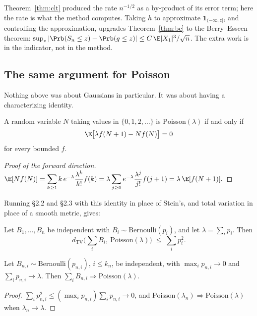 \documentclass[11pt]{article}
\newcommand{\Poi}{\mathrm{Poisson}}
\newcommand{\Ber}{\mathrm{Bernoulli}}
\newcommand{\TV}{d_{\mathrm{TV}}}
\begin{document}
\begin{remark}
Theorem~\ref{thm:clt} produced the rate $n^{-1/2}$ as a by-product of its error term; here the rate is what the method computes. Taking $h$ to approximate $\mathbf 1_{(-\infty,z]}$, and controlling the approximation, upgrades Theorem~\ref{thm:be} to the Berry--Esseen theorem: $\sup_z|\Prb(S_n\le z)-\Prb(g\le z)|\le C\,\E|X_1|^3/\sqrt n$. The extra work is in the indicator, not in the method.
\end{remark}

\subsection{The same argument for Poisson}

Nothing above was about Gaussians in particular. It was about having a characterizing identity.

\begin{theorem}
A random variable $N$ taking values in $\{0,1,2,\dots\}$ is $\Poi(\lambda)$ if and only if
\[
\E\big[\lambda f(N+1)-Nf(N)\big]=0
\]
for every bounded $f$.
\end{theorem}

\begin{proof}[Proof of the forward direction]
$\displaystyle \E[Nf(N)]=\sum_{k\ge1}k\,e^{-\lambda}\frac{\lambda^k}{k!}f(k)=\lambda\sum_{j\ge0}e^{-\lambda}\frac{\lambda^j}{j!}f(j+1)=\lambda\,\E[f(N+1)].$
\end{proof}

Running \S2.2 and \S2.3 with this identity in place of Stein's, and total variation in place of a smooth metric, gives:

\begin{theorem}[Le Cam]\label{thm:lecam}
Let $B_1,\dots,B_n$ be independent with $B_i\sim\Ber(p_i)$, and let $\lambda=\sum_ip_i$. Then
\[
\TV\Big(\sum_iB_i,\ \Poi(\lambda)\Big)\;\le\;\sum_i p_i^2 .
\]
\end{theorem}

\begin{corollary}\label{thm:poisson}
Let $B_{n,i}\sim\Ber(p_{n,i})$, $i\le k_n$, be independent, with $\max_i p_{n,i}\to0$ and $\sum_i p_{n,i}\to\lambda$. Then $\sum_i B_{n,i}\Rightarrow\Poi(\lambda)$.
\end{corollary}

\begin{proof}
$\sum_ip_{n,i}^2\le(\max_ip_{n,i})\sum_ip_{n,i}\to0$, and $\Poi(\lambda_n)\Rightarrow\Poi(\lambda)$ when $\lambda_n\to\lambda$.
\end{proof}
\end{document}
